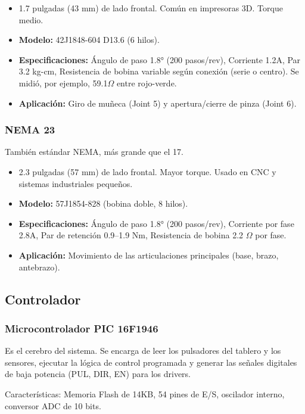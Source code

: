 \documentclass[11pt]{article}
\begin{document}
\begin{itemize}
	\item 1.7 pulgadas (43 mm) de lado frontal. Común en impresoras 3D. Torque medio.
	\item \textbf{Modelo:} 42J1848-604 D13.6 (6 hilos).
	\item \textbf{Especificaciones:} Ángulo de paso 1.8° (200 pasos/rev), Corriente 1.2A, Par 3.2 kg-cm, Resistencia de bobina variable según conexión (serie o centro). Se midió, por ejemplo, 59.1$\Omega$ entre rojo-verde.
	\item \textbf{Aplicación:} Giro de muñeca (Joint 5) y apertura/cierre de pinza (Joint 6).
\end{itemize}

\subsubsection{NEMA 23}

También estándar NEMA, más grande que el 17.

\begin{itemize}
	\item 2.3 pulgadas (57 mm) de lado frontal. Mayor torque. Usado en CNC y sistemas industriales pequeños.
	\item \textbf{Modelo:} 57J1854-828 (bobina doble, 8 hilos).
	\item \textbf{Especificaciones:} Ángulo de paso 1.8° (200 pasos/rev), Corriente por fase 2.8A, Par de retención 0.9–1.9 Nm, Resistencia de bobina 2.2 $\Omega$ por fase.
	\item \textbf{Aplicación:} Movimiento de las articulaciones principales (base, brazo, antebrazo).
\end{itemize}

\subsection{Controlador}

\subsubsection{Microcontrolador PIC 16F1946}

Es el cerebro del sistema. Se encarga de leer los pulsadores del tablero y los sensores, ejecutar la lógica de control programada y generar las señales digitales de baja potencia (PUL, DIR, EN) para los drivers.

Características: Memoria Flash de 14KB, 54 pines de E/S, oscilador interno, conversor ADC de 10 bits.
\end{document}
